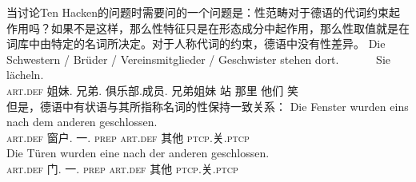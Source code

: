当讨论Ten Hacken的问题时需要问的一个问题是：性范畴对于德语的代词约束起作用吗？如果不是这样，那么性特征只是在形态成分中起作用，那么性取值就是在词库中由特定的名词所决定。对于人称代词的约束，德语中没有性差异。
\ea
\gll Die Schwestern / Brüder / Vereinsmitglieder / Geschwister stehen dort.~~~~~~ Sie lächeln.\\
     \textsc{art}.\textsc{def} 姐妹.\fem{} {} 兄弟.\mas{} {} 俱乐部.成员.\neu{} {} 兄弟姐妹 站 那里 他们 笑\\
\z
但是，德语中有状语与其所指称名词的性保持一致关系\citep[\S~6]{Hoehle83}：
\eal
\label{Beispiel-einer-nach-dem-anderen}
\ex
\gll Die Fenster wurden eins nach dem anderen geschlossen.\\
	 \textsc{art}.\textsc{def} 窗户.\neu{}  \passivepst{} 一.\neu{} \textsc{prep} \textsc{art}.\textsc{def} 其他 \textsc{ptcp}.关.\textsc{ptcp}\\
\ex 
\gll Die Türen wurden eine nach der anderen geschlossen.\\
	\textsc{art}.\textsc{def} 门.\fem{} \passivepst{} 一.\fem{} \textsc{prep} \textsc{art}.\textsc{def} 其他 \textsc{ptcp}.关.\textsc{ptcp}\\
